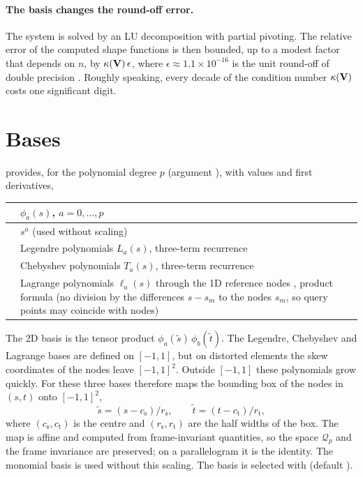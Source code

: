 \paragraph{The basis changes the round-off error.} The system is solved by an LU
decomposition with partial pivoting. The relative error of the computed shape
functions is then bounded, up to a modest factor that depends on $n$, by
$\kappa(\mathbf{V})\,\epsilon$, where $\epsilon\approx1.1\times10^{-16}$ is the unit
round-off of double precision \parencite{Higham2002Accuracy}. Roughly speaking,
every decade of the condition number $\kappa(\mathbf{V})$ costs one significant
digit.

\section{Bases}

 provides, for the polynomial
degree $p$ (argument ), with values and first derivatives,
\begin{center}
  \begin{tabularx}{\linewidth}{@{}lL@{}}
    \toprule
     & $\phi_a(s)$, $a=0,\dots,p$ \\
    \midrule
     & $s^a$ (used without scaling) \\
     & Legendre polynomials $L_a(s)$, three-term recurrence \\
     & Chebyshev polynomials $T_a(s)$, three-term recurrence \\
     & Lagrange polynomials $\ell_a(s)$ through the 1D reference
      nodes , product formula (no division by
      the differences $s-s_m$ to the nodes $s_m$, so query points may coincide
      with nodes) \\
    \bottomrule
  \end{tabularx}
\end{center}
The 2D basis is the tensor product $\phi_a(\tilde s)\,\phi_b(\tilde t)$. The
Legendre, Chebyshev and Lagrange bases are defined on $[-1,1]$, but on distorted
elements the skew coordinates of the nodes leave $[-1,1]^2$. Outside $[-1,1]$ these
polynomials grow quickly. For these three bases 
therefore maps the bounding box of the nodes in $(s,t)$ onto $[-1,1]^2$,
\begin{equation}
  \tilde s = (s-c_\mathrm{s})/r_\mathrm{s},\qquad
  \tilde t = (t-c_\mathrm{t})/r_\mathrm{t},
\end{equation}
where $(c_\mathrm{s},c_\mathrm{t})$ is the centre and $(r_\mathrm{s},r_\mathrm{t})$
are the half widths of the box. The map is affine and computed from
frame-invariant quantities, so the space $\mathcal Q_p$ and the frame invariance are
preserved; on a parallelogram it is the identity. The monomial basis is used
without this scaling. The basis is selected with  (default
).


